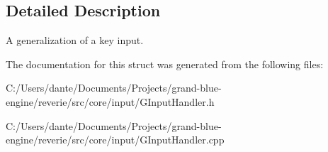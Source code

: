 \subsection{Detailed Description}
A generalization of a key input. 

The documentation for this struct was generated from the following files\+:\begin{DoxyCompactItemize}
\item 
C\+:/\+Users/dante/\+Documents/\+Projects/grand-\/blue-\/engine/reverie/src/core/input/G\+Input\+Handler.\+h\item 
C\+:/\+Users/dante/\+Documents/\+Projects/grand-\/blue-\/engine/reverie/src/core/input/G\+Input\+Handler.\+cpp\end{DoxyCompactItemize}
